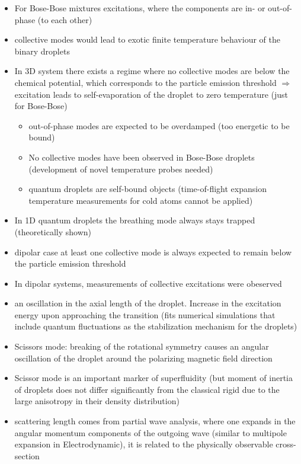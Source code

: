 \begin{itemize}
    \item For Bose-Bose mixtures excitations, where the components are in- or out-of- phase (to each other)
    \item collective modes would lead to exotic finite temperature behaviour of the binary droplets
    \item In 3D system there exists a regime where no collective modes are below the chemical potential,
        which corresponds to the particle emission threshold
        $\Rightarrow$ excitation leads to self-evaporation of the droplet to zero temperature (just for Bose-Bose)
    \begin{itemize}
        \item out-of-phase modes are expected to be overdamped (too energetic to be bound)
        \item No collective modes have been observed in Bose-Bose droplets
            (development of novel temperature probes needed)
        \item quantum droplets are self-bound objects
            (time-of-flight expansion temperature measurements for cold atoms cannot be applied)
    \end{itemize}
    \item In 1D quantum droplets the breathing mode always stays trapped (theoretically shown)
    \item dipolar case at least one collective mode is always expected to remain below the particle emission threshold
    \item In dipolar systems, measurements of collective excitations were obeserved
    \item an oscillation in the axial length of the droplet.
        Increase in the excitation energy upon approaching the transition
        (fits numerical simulations that include quantum fluctuations as the stabilization mechanism for the droplets)
    \item Scissors mode: breaking of the rotational symmetry causes an angular oscillation of the droplet
around the polarizing magnetic field direction
    \item Scissor mode is an important marker of superfluidity (but moment of inertia
        of droplets does not differ significantly from the classical rigid due to the large anisotropy
        in their density distribution)
    \item scattering length comes from partial wave analysis, where one expands in the angular momentum components
        of the outgoing wave (similar to multipole expansion in Electrodynamic),
        it is related to the physically observable cross-section
\end{itemize}


